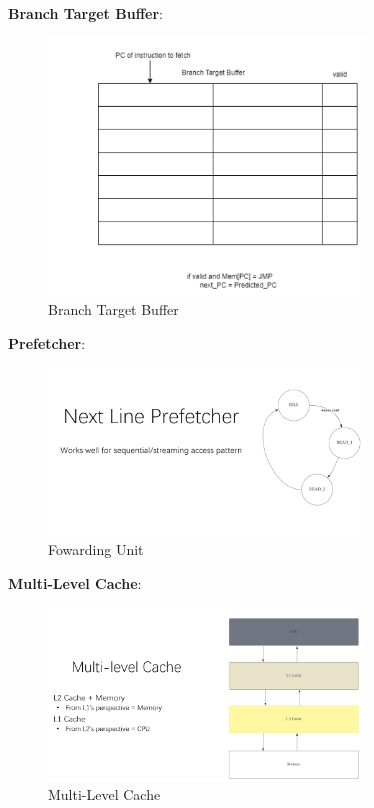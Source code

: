 \documentclass[12pt, a4paper]{article}
\begin{document}
\textbf{Branch Target Buffer}:

    \begin{figure}[H]
        \centering
        \includegraphics[width=0.75\textwidth]{branch_target_buffer.png}
        \caption{Branch Target Buffer}
        \label{fig:enter-label}
    \end{figure}

\textbf{Prefetcher}: 

    \begin{figure}[H]
        \centering
        \includegraphics[width=0.75\textwidth]{prefetcher.png}
        \caption{Fowarding Unit}
        \label{fig:enter-label}
    \end{figure}

\textbf{Multi-Level Cache}:

    \begin{figure}[H]
        \centering
        \includegraphics[width=0.75\textwidth]{multi_level_cache.png}
        \caption{Multi-Level Cache}
        \label{fig:enter-label}
    \end{figure}
\end{document}
